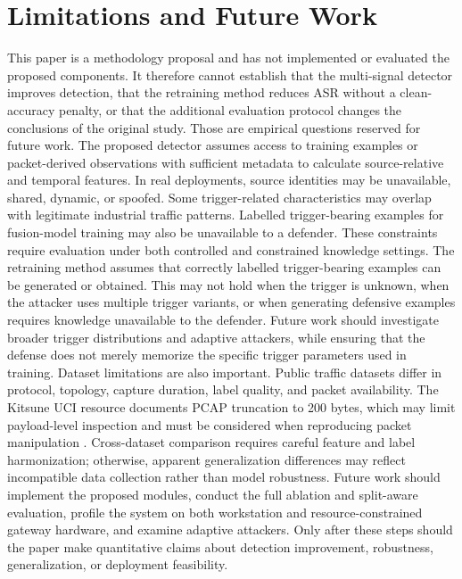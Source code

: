 \documentclass[11pt]{article}
\begin{document}
\section{Limitations and Future Work}
This paper is a methodology proposal and has not implemented or evaluated the proposed components. It therefore cannot establish that the multi-signal detector improves detection, that the retraining method reduces ASR without a clean-accuracy penalty, or that the additional evaluation protocol changes the conclusions of the original study. Those are empirical questions reserved for future work. The proposed detector assumes access to training examples or packet-derived observations with sufficient metadata to calculate source-relative and temporal features. In real deployments, source identities may be unavailable, shared, dynamic, or spoofed. Some trigger-related characteristics may overlap with legitimate industrial traffic patterns. Labelled trigger-bearing examples for fusion-model training may also be unavailable to a defender. These constraints require evaluation under both controlled and constrained knowledge settings. The retraining method assumes that correctly labelled trigger-bearing examples can be generated or obtained. This may not hold when the trigger is unknown, when the attacker uses multiple trigger variants, or when generating defensive examples requires knowledge unavailable to the defender. Future work should investigate broader trigger distributions and adaptive attackers, while ensuring that the defense does not merely memorize the specific trigger parameters used in training. Dataset limitations are also important. Public traffic datasets differ in protocol, topology, capture duration, label quality, and packet availability. The Kitsune UCI resource documents PCAP truncation to 200 bytes, which may limit payload-level inspection and must be considered when reproducing packet manipulation \cite{ref10}. Cross-dataset comparison requires careful feature and label harmonization; otherwise, apparent generalization differences may reflect incompatible data collection rather than model robustness. Future work should implement the proposed modules, conduct the full ablation and split-aware evaluation, profile the system on both workstation and resource-constrained gateway hardware, and examine adaptive attackers. Only after these steps should the paper make quantitative claims about detection improvement, robustness, generalization, or deployment feasibility.
\end{document}
